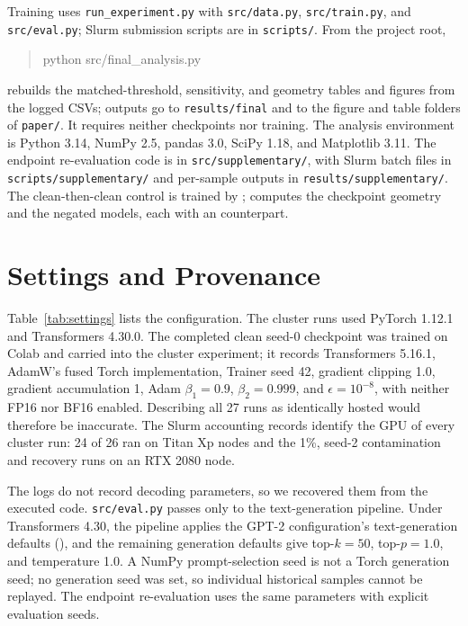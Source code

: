 \documentclass[11pt,a4paper]{article}
\begin{document}
Training uses \texttt{run\_experiment.py} with \texttt{src/data.py}, \texttt{src/train.py}, and \texttt{src/eval.py}; Slurm submission scripts are in \texttt{scripts/}. From the project root,
\begin{quote}\small\ttfamily
python src/final\_analysis.py
\end{quote}
rebuilds the matched-threshold, sensitivity, and geometry tables and figures from the logged CSVs; outputs go to \texttt{results/final} and to the figure and table folders of \texttt{paper/}. It requires neither checkpoints nor training. The analysis environment is Python 3.14, NumPy 2.5, pandas 3.0, SciPy 1.18, and Matplotlib 3.11. The endpoint re-evaluation code is in \texttt{src/supplementary/}, with Slurm batch files in \texttt{scripts/supplementary/} and per-sample outputs in \texttt{results/supplementary/}. The clean-then-clean control is trained by ;  computes the checkpoint geometry and  the negated models, each with an  counterpart.

\section{Settings and Provenance}
\label{app:settings}
Table~\ref{tab:settings} lists the configuration. The cluster runs used PyTorch 1.12.1 and Transformers 4.30.0. The completed clean seed-0 checkpoint was trained on Colab and carried into the cluster experiment; it records Transformers 5.16.1, AdamW's fused Torch implementation, Trainer seed 42, gradient clipping 1.0, gradient accumulation 1, Adam $\beta_1=0.9$, $\beta_2=0.999$, and $\epsilon=10^{-8}$, with neither FP16 nor BF16 enabled. Describing all 27 runs as identically hosted would therefore be inaccurate. The Slurm accounting records identify the GPU of every cluster run: 24 of 26 ran on Titan Xp nodes and the 1\%, seed-2 contamination and recovery runs on an RTX 2080 node.

The logs do not record decoding parameters, so we recovered them from the executed code. \texttt{src/eval.py} passes only  to the text-generation pipeline. Under Transformers 4.30, the pipeline applies the GPT-2 configuration's text-generation defaults (), and the remaining generation defaults give top-$k=50$, top-$p=1.0$, and temperature 1.0. A NumPy prompt-selection seed is not a Torch generation seed; no generation seed was set, so individual historical samples cannot be replayed. The endpoint re-evaluation uses the same parameters with explicit evaluation seeds.
\end{document}

